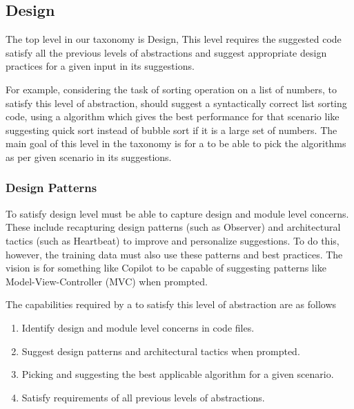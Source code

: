 \subsection{Design}
\label{design}
The top level in our taxonomy is Design, This level requires the suggested code satisfy all the previous levels of abstractions and suggest appropriate design practices for a given input in its suggestions.

For example, considering the task of sorting operation on a list of numbers, to satisfy this level of abstraction, \cct should suggest a syntactically correct list sorting code, using a algorithm which gives the best performance for that scenario like suggesting quick sort instead of bubble sort if it is a large set of numbers. The main goal of this level in the taxonomy is for a \cct{} to be able to pick the algorithms as per given scenario in its suggestions.

\subsubsection{Design Patterns}
\label{patterns}
To satisfy design level \cct{} must be able to capture design and module level concerns. 
These include recapturing design patterns (such as Observer) and architectural tactics (such as Heartbeat) to improve and personalize suggestions. 
To do this, however, the training data must also use these patterns and best practices.
The vision is for something like Copilot to be capable of suggesting patterns like Model-View-Controller (MVC) when prompted. 

The capabilities required by a \cct{} to satisfy this level of abstraction are as follows
\begin{enumerate}
    \item Identify design and module level concerns in code files.
    \item Suggest design patterns and architectural tactics when prompted.
    \item Picking and suggesting the best applicable algorithm for a given scenario.
    \item Satisfy requirements of all previous levels of abstractions.
\end{enumerate}